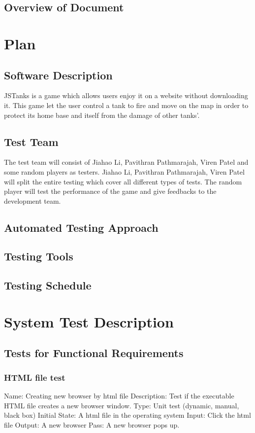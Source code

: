 \documentclass{article}
\begin{document}
\subsection{Overview of Document}

\section{Plan}
\subsection{Software Description}
JSTanks is a game which allows users enjoy it on a website without downloading it. This game let the user control a tank to fire and move on the map in order to protect its home base and itself from the damage of other tanks'.
\subsection{Test Team}
The test team will consist of Jiahao Li, Pavithran Pathmarajah, Viren Patel and some random players as testers. Jiahao Li, Pavithran Pathmarajah, Viren Patel will split the entire testing which cover all different types of tests. The random player will test the performance of the game and give feedbacks to the development team.
\subsection{Automated Testing Approach}
\subsection{Testing Tools}
\subsection{Testing Schedule}

\section{System Test Description}
\subsection{Tests for Functional Requirements}
\subsubsection{HTML file test}
Name:  Creating new browser by html file \newline
Description: Test if the executable HTML file creates a new browser window. \newline
Type: Unit test (dynamic, manual, black box) \newline
Initial State:  A html file in the operating system \newline
Input: Click the html file \newline
Output: A new browser \newline
Pass: A new browser pops up. \newline
\end{document}
